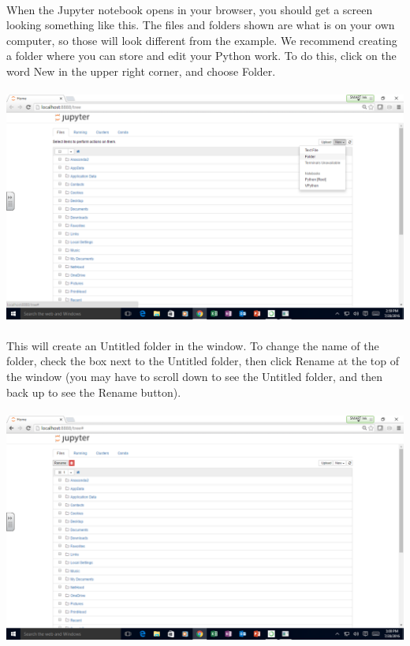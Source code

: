 \documentclass[]{article}
\begin{document}
\paragraph{}
When the Jupyter notebook opens in your browser, you should get a screen looking something like this. The files and folders shown are what is on your own computer, so those will look different from the example. We recommend creating a folder where you can store and edit your Python work. To do this, click on the word New in the upper right corner, and choose Folder.
\paragraph{}
\begin{centering}
    \centerline{\includegraphics[scale=0.35]{Screenshot_16.png}}
\end{centering}

\paragraph{}
This will create an Untitled folder in the window. To change the name of the folder, check the box next to the Untitled folder, then click Rename at the top of the window (you may have to scroll down to see the Untitled folder, and then back up to see the Rename button).
\paragraph{}
\begin{centering}
    \centerline{\includegraphics[scale=0.35]{Screenshot_18.png}}
\end{centering}
\end{document}
